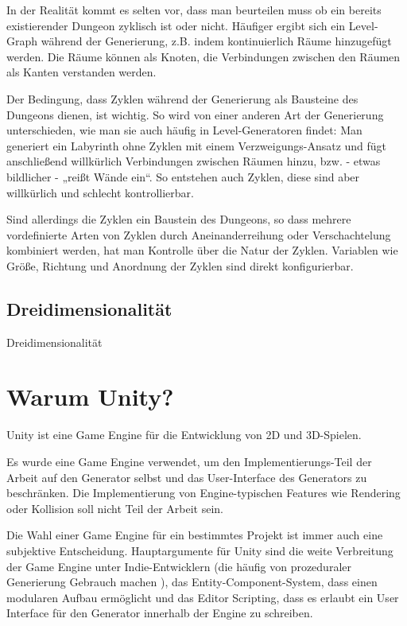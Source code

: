 In der Realität kommt es selten vor, dass man beurteilen muss ob ein bereits existierender Dungeon zyklisch ist oder nicht. Häufiger ergibt sich ein Level-Graph während der Generierung, z.B. indem kontinuierlich Räume hinzugefügt werden. Die Räume können als Knoten, die Verbindungen zwischen den Räumen als Kanten verstanden werden.

Der Bedingung, dass Zyklen während der Generierung als Bausteine des Dungeons dienen, ist wichtig. So wird von einer anderen Art der Generierung unterschieden, wie man sie auch häufig in Level-Generatoren findet: Man generiert ein Labyrinth ohne Zyklen mit einem Verzweigungs-Ansatz und fügt anschließend willkürlich Verbindungen zwischen Räumen hinzu, bzw. - etwas bildlicher - „reißt Wände ein“. So entstehen auch Zyklen, diese sind aber willkürlich und schlecht kontrollierbar. 

Sind allerdings die Zyklen ein Baustein des Dungeons, so dass mehrere vordefinierte Arten von Zyklen durch Aneinanderreihung oder Verschachtelung kombiniert werden, hat man Kontrolle über die Natur der Zyklen. Variablen wie Größe, Richtung und Anordnung der Zyklen sind direkt konfigurierbar.

\subsection{Dreidimensionalität}

Dreidimensionalität 

\section{Warum Unity?}

Unity ist eine Game Engine für die Entwicklung von 2D und 3D-Spielen. 

Es wurde eine Game Engine verwendet, um den Implementierungs-Teil der Arbeit auf den Generator selbst und das User-Interface des Generators zu beschränken. Die Implementierung von Engine-typischen Features wie Rendering oder Kollision soll nicht Teil der Arbeit sein.

Die Wahl einer Game Engine für ein bestimmtes Projekt ist immer auch eine subjektive Entscheidung. Hauptargumente für Unity sind die weite Verbreitung der Game Engine unter Indie-Entwicklern (die häufig von prozeduraler Generierung Gebrauch machen ), das Entity-Component-System, dass einen modularen Aufbau ermöglicht und das Editor Scripting, dass es erlaubt ein User Interface für den Generator innerhalb der Engine zu schreiben. 

